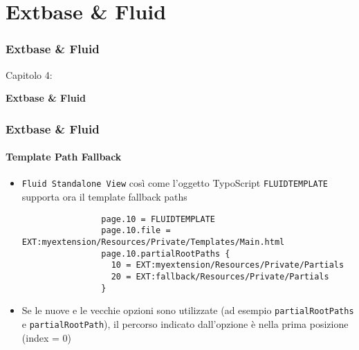 %

\section{Extbase \& Fluid}
\begin{frame}[fragile]
	\frametitle{Extbase \& Fluid}

	\begin{center}\huge{Capitolo 4:}\end{center}
	\begin{center}\huge{\color{typo3darkgrey}\textbf{Extbase \& Fluid}}\end{center}

\end{frame}


\begin{frame}[fragile]
	\frametitle{Extbase \& Fluid}
	\framesubtitle{Template Path Fallback}

	\lstset{
		basicstyle=\tiny\ttfamily
	}

	\begin{itemize}
		\item \texttt{Fluid Standalone View} così come l'oggetto TypoScript \texttt{FLUIDTEMPLATE} supporta ora il template fallback paths

			\begin{lstlisting}
				page.10 = FLUIDTEMPLATE
				page.10.file = EXT:myextension/Resources/Private/Templates/Main.html
				page.10.partialRootPaths {
				  10 = EXT:myextension/Resources/Private/Partials
				  20 = EXT:fallback/Resources/Private/Partials
				}
			\end{lstlisting}

		\item Se le nuove e le vecchie opzioni sono utilizzate (ad esempio \texttt{partialRootPaths} e \texttt{partialRootPath}),
			il percorso indicato dall'opzione è nella prima posizione (index = 0)

	\end{itemize}

\end{frame}

